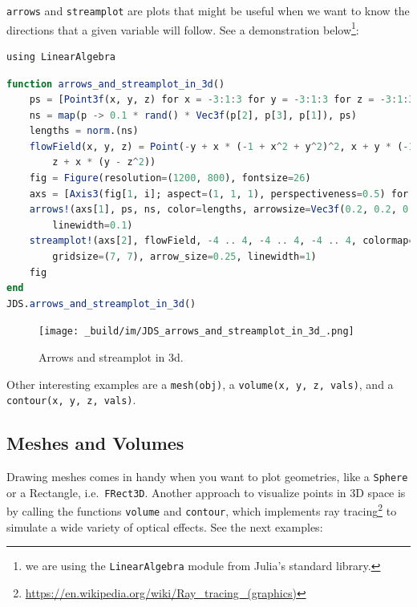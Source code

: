 \documentclass[
  notoc %
]{tufte-book}
\DeclareRobustCommand{\href}[2]{#2\footnote{\url{#1}}}
\newcommand{\passthrough}[1]{#1}
\begin{document}
\passthrough{\lstinline!arrows!} and
\passthrough{\lstinline!streamplot!} are plots that might be useful when
we want to know the directions that a given variable will follow. See a
demonstration below\footnote{we are using the
  \passthrough{\lstinline!LinearAlgebra!} module from Julia's standard
  library.}:

\begin{lstlisting}
using LinearAlgebra
\end{lstlisting}

\begin{lstlisting}[language=Julia]
function arrows_and_streamplot_in_3d()
    ps = [Point3f(x, y, z) for x = -3:1:3 for y = -3:1:3 for z = -3:1:3]
    ns = map(p -> 0.1 * rand() * Vec3f(p[2], p[3], p[1]), ps)
    lengths = norm.(ns)
    flowField(x, y, z) = Point(-y + x * (-1 + x^2 + y^2)^2, x + y * (-1 + x^2 + y^2)^2,
        z + x * (y - z^2))
    fig = Figure(resolution=(1200, 800), fontsize=26)
    axs = [Axis3(fig[1, i]; aspect=(1, 1, 1), perspectiveness=0.5) for i = 1:2]
    arrows!(axs[1], ps, ns, color=lengths, arrowsize=Vec3f(0.2, 0.2, 0.3),
        linewidth=0.1)
    streamplot!(axs[2], flowField, -4 .. 4, -4 .. 4, -4 .. 4, colormap=:plasma,
        gridsize=(7, 7), arrow_size=0.25, linewidth=1)
    fig
end
JDS.arrows_and_streamplot_in_3d()
\end{lstlisting}

\begin{figure}
\hypertarget{fig:arrows_and_streamplot_in_3d}{%
\centering
\texttt{[image: \_build/im/JDS\_arrows\_and\_streamplot\_in\_3d\_.png]}
\caption{Arrows and streamplot in
3d.}\label{fig:arrows_and_streamplot_in_3d}
}
\end{figure}

Other interesting examples are a \passthrough{\lstinline!mesh(obj)!}, a
\passthrough{\lstinline!volume(x, y, z, vals)!}, and a
\passthrough{\lstinline!contour(x, y, z, vals)!}.

\hypertarget{meshes-and-volumes}{%
\subsection{Meshes and Volumes}\label{meshes-and-volumes}}

Drawing meshes comes in handy when you want to plot geometries, like a
\passthrough{\lstinline!Sphere!} or a Rectangle,
i.e.~\passthrough{\lstinline!FRect3D!}. Another approach to visualize
points in 3D space is by calling the functions
\passthrough{\lstinline!volume!} and \passthrough{\lstinline!contour!},
which implements
\href{https://en.wikipedia.org/wiki/Ray_tracing_(graphics)}{ray tracing}
to simulate a wide variety of optical effects. See the next examples:
\end{document}
